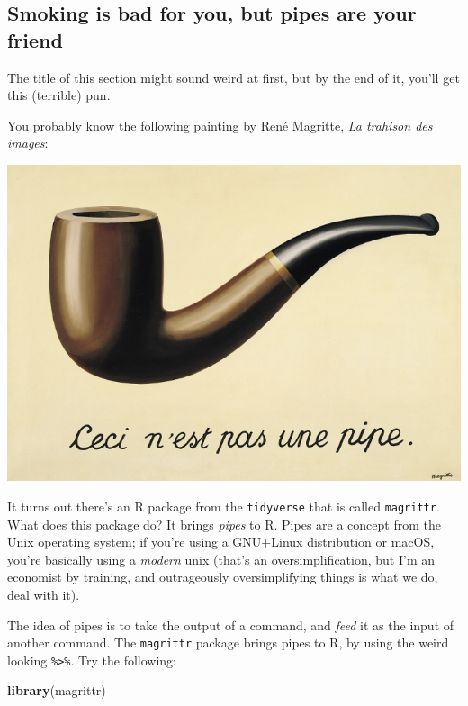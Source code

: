 \documentclass[]{gitbook}
\newenvironment{Shaded}{\begin{snugshade}}{\end{snugshade}}
\newcommand{\KeywordTok}[1]{\textcolor[rgb]{0.13,0.29,0.53}{\textbf{#1}}}
\newcommand{\NormalTok}[1]{#1}
\theoremstyle{definition}
\theoremstyle{definition}
\theoremstyle{definition}
\theoremstyle{remark}
\begin{document}
\hypertarget{smoking-is-bad-for-you-but-pipes-are-your-friend}{%
\subsection{Smoking is bad for you, but pipes are your
friend}\label{smoking-is-bad-for-you-but-pipes-are-your-friend}}

The title of this section might sound weird at first, but by the end of
it, you'll get this (terrible) pun.

You probably know the following painting by René Magritte, \emph{La
trahison des images}:

\includegraphics[width=9.72in]{assets/pas_une_pipe}

It turns out there's an R package from the \texttt{tidyverse} that is
called \texttt{magrittr}. What does this package do? It brings
\emph{pipes} to R. Pipes are a concept from the Unix operating system;
if you're using a GNU+Linux distribution or macOS, you're basically
using a \emph{modern} unix (that's an oversimplification, but I'm an
economist by training, and outrageously oversimplifying things is what
we do, deal with it).

The idea of pipes is to take the output of a command, and \emph{feed} it
as the input of another command. The \texttt{magrittr} package brings
pipes to R, by using the weird looking \texttt{\%\textgreater{}\%}. Try
the following:

\begin{Shaded}
\begin{Highlighting}[]
\KeywordTok{library}\NormalTok{(magrittr)}
\end{Highlighting}
\end{Shaded}
\end{document}
